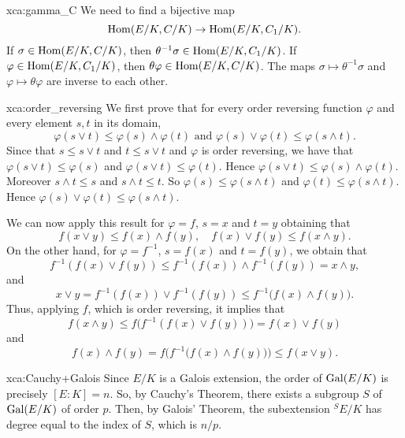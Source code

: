 \begin{sol}{xca:gamma_C}
We need to find a bijective map 
\[
\operatorname{Hom}(E/K,C/K)\to\operatorname{Hom}(E/K,C_1/K).
\]
If $\sigma\in\operatorname{Hom}(E/K,C/K)$, then $\theta^{-1}\sigma\in\operatorname{Hom}(E/K,C_1/K)$. 
If $\varphi\in\operatorname{Hom}(E/K,C_1/K)$, then $\theta\varphi\in\operatorname{Hom}(E/K,C/K)$. The 
maps $\sigma\mapsto\theta^{-1}\sigma$ and 
$\varphi\mapsto\theta\varphi$ are inverse to each other. 
\end{sol}

\begin{sol}{xca:order_reversing}
    We first prove that for every order
    reversing function $\varphi$
    and every element $s,t$ in its domain,
    \[
    \varphi(s\vee t)\leq \varphi(s)\wedge \varphi(t) \text{ and }
    \varphi(s)\vee \varphi(t)\leq \varphi(s\wedge t).
    \]
    Since that $s\leq s\vee t$
    and $t\leq s\vee t$ and $\varphi$
    is order reversing,
    we have that $\varphi(s\vee t)\leq \varphi(s)$ 
    and $\varphi(s\vee t)\leq \varphi(t)$.
    Hence $\varphi(s\vee t)\leq \varphi(s)\wedge \varphi(t).$
    Moreover $s\wedge t\leq s$
    and $s\wedge t\leq t$.
    So $\varphi(s)\leq \varphi(s\wedge t)$ and $\varphi(t)\leq \varphi(s\wedge t)$.
    Hence 
    $\varphi(s)\vee \varphi(t)\leq \varphi(s\wedge t).$

    We can now apply this result
    for $\varphi=f$, $s=x$ and $t=y$
    obtaining that
    \[
    f(x\vee y)\leq f(x)\wedge f(y), \quad
    f(x)\vee f(y)\leq f(x\wedge y).
    \]
    On the other hand, for $\varphi=f^{-1}$, 
    $s=f(x)$ and $t=f(y)$,
    we obtain that 
    \[
    f^{-1}(f(x)\vee f(y))\leq
    f^{-1}(f(x))\wedge f^{-1}(f(y))=
    x\wedge y,
    \]
    and
    \[
    x\vee y=f^{-1}(f(x))\vee f^{-1}(f(y))\leq f^{-1}\big(f(x)\wedge f(y)\big).
    \]
    Thus, applying $f$, which is order reversing,
    it implies that 
    \[
    f(x\wedge y)\leq f\big(f^{-1}(f(x)\vee f(y))\big)=
    f(x)\vee f(y)
    \]
    and
    \[
    f(x)\wedge f(y)=f\big(f^{-1}\big(f(x)\wedge f(y)\big)\big)\leq f(x\vee y).
    \]
 \end{sol}

 \begin{sol}{xca:Cauchy+Galois}
     Since $E/K$ is a Galois extension,
     the order of $\operatorname{Gal}(E/K)$ is precisely $[E:K]=n$.
     So, by Cauchy's Theorem, there exists a subgroup $S$ 
     of $\operatorname{Gal}(E/K)$
     of order $p$.
     Then, by Galois' Theorem, the subextension
     ${}^SE/K$
     has degree equal to the index of $S$,
     which is $n/p$.
 \end{sol}

